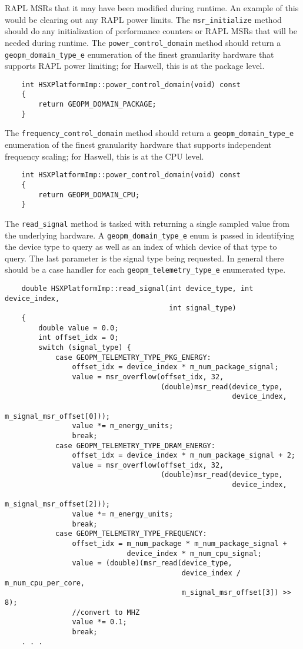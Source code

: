 \documentclass[11pt]{article}
\begin{document}
RAPL MSRs that it may have been modified during runtime. An example of
this would be clearing out any RAPL power limits.  The
\verb#msr_initialize# method should do any initialization of
performance counters or RAPL MSRs that will be needed during runtime.
The \verb#power_control_domain# method should return a
\verb#geopm_domain_type_e# enumeration of the finest granularity
hardware that supports RAPL power limiting; for Haswell, this is at
the package level.
\begin{verbatim}
    int HSXPlatformImp::power_control_domain(void) const
    {
        return GEOPM_DOMAIN_PACKAGE;
    }
\end{verbatim}
The \verb#frequency_control_domain# method should return a
\verb#geopm_domain_type_e# enumeration of the finest granularity
hardware that supports independent frequency scaling; for Haswell,
this is at the CPU level.
\begin{verbatim}
    int HSXPlatformImp::power_control_domain(void) const
    {
        return GEOPM_DOMAIN_CPU;
    }
\end{verbatim}
The \verb#read_signal# method is tasked with returning a single
sampled value from the underlying hardware. A
\verb#geopm_domain_type_e# enum is passed in identifying the device
type to query as well as an index of which device of that type to
query. The last parameter is the signal type being requested. In
general there should be a case handler for each
\verb#geopm_telemetry_type_e# enumerated type.
\begin{verbatim}
    double HSXPlatformImp::read_signal(int device_type, int device_index,
                                       int signal_type)
    {
        double value = 0.0;
        int offset_idx = 0;
        switch (signal_type) {
            case GEOPM_TELEMETRY_TYPE_PKG_ENERGY:
                offset_idx = device_index * m_num_package_signal;
                value = msr_overflow(offset_idx, 32,
                                     (double)msr_read(device_type,
                                                      device_index,
                                                      m_signal_msr_offset[0]));
                value *= m_energy_units;
                break;
            case GEOPM_TELEMETRY_TYPE_DRAM_ENERGY:
                offset_idx = device_index * m_num_package_signal + 2;
                value = msr_overflow(offset_idx, 32,
                                     (double)msr_read(device_type,
                                                      device_index,
                                                      m_signal_msr_offset[2]));
                value *= m_energy_units;
                break;
            case GEOPM_TELEMETRY_TYPE_FREQUENCY:
                offset_idx = m_num_package * m_num_package_signal +
                             device_index * m_num_cpu_signal;
                value = (double)(msr_read(device_type,
                                          device_index / m_num_cpu_per_core,
                                          m_signal_msr_offset[3]) >> 8);
                //convert to MHZ
                value *= 0.1;
                break;
    . . .
\end{verbatim}
\end{document}
